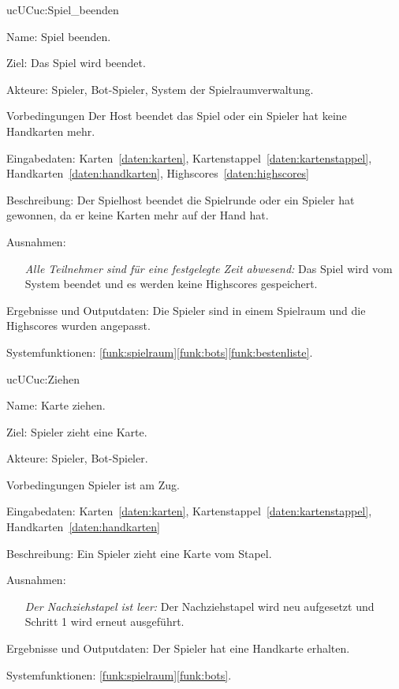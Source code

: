 \begin{description}[leftmargin=5em, style=sameline]
	\begin{lhp}{uc}{UC}{uc:Spiel_beenden}
		\item [Name:] Spiel beenden.
		\item [Ziel:] Das Spiel wird beendet.
		\item [Akteure:] Spieler, Bot-Spieler, System der Spielraumverwaltung.
		\item [Vorbedingungen] Der Host beendet das Spiel oder ein Spieler hat keine Handkarten mehr.
		\item [Eingabedaten:] Karten~\ref{daten:karten}, Kartenstappel~\ref{daten:kartenstappel}, Handkarten~\ref{daten:handkarten}, Highscores~\ref{daten:highscores} 
		\item [Beschreibung:] Der Spielhost beendet die Spielrunde oder ein Spieler hat gewonnen, da er keine Karten mehr auf der Hand hat.
		\item [Ausnahmen:] \hfill
			\begin{itemize} 
				\item[] \textit{Alle Teilnehmer sind für eine festgelegte Zeit abwesend:} Das Spiel wird vom System beendet und es werden keine Highscores gespeichert.
			\end{itemize}
		\item [Ergebnisse und Outputdaten:] Die Spieler sind in einem Spielraum und die Highscores wurden angepasst.
		\item [Systemfunktionen:] \ref{funk:spielraum}\ref{funk:bots}\ref{funk:bestenliste}.
	\end{lhp}
	
	\begin{lhp}{uc}{UC}{uc:Ziehen}
		\item [Name:] Karte ziehen.
		\item [Ziel:] Spieler zieht eine Karte.
		\item [Akteure:] Spieler, Bot-Spieler.
		\item [Vorbedingungen] Spieler ist am Zug.
		\item [Eingabedaten:] Karten~\ref{daten:karten}, Kartenstappel~\ref{daten:kartenstappel}, Handkarten~\ref{daten:handkarten}
		\item [Beschreibung:] Ein Spieler zieht eine Karte vom Stapel.
		\item [Ausnahmen:] \hfill
			\begin{itemize} 
				\item[] \textit{Der Nachziehstapel ist leer:} Der Nachziehstapel wird neu aufgesetzt und Schritt 1 wird erneut ausgeführt.
			\end{itemize}
		\item [Ergebnisse und Outputdaten:] Der Spieler hat eine Handkarte erhalten.
		\item [Systemfunktionen:] \ref{funk:spielraum}\ref{funk:bots}.
	\end{lhp}
	

\end{description}
